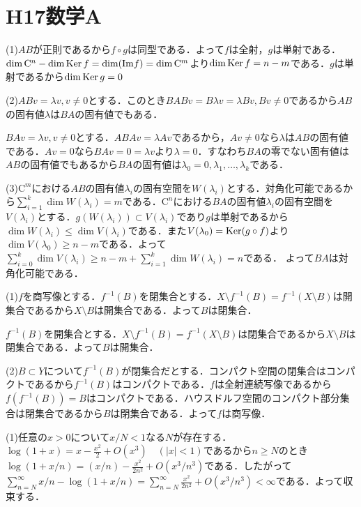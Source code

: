 \documentclass[
		book,
		head_space=20mm,
		foot_space=20mm,
		gutter=10mm,
		line_length=190mm
]{jlreq}
\begin{document}
\section{H17数学A}
(1)$AB$が正則であるから$f\circ g$は同型である．よって$f$は全射，$g$は単射である．$\dim \mathrm{C}^n-\dim \mathop{\mathrm{Ker}} f=\dim(\mathrm{Im} f)=\dim \mathrm{C}^m$より$\dim \mathop{\mathrm{Ker}} f=n-m$である．$g$は単射であるから$\dim \mathop{\mathrm{Ker}} g=0$

(2)$AB v=\lambda v,v\neq 0$とする．このとき$BAB v=B\lambda v=\lambda Bv,Bv\neq 0$であるから$AB$の固有値$\lambda$は$BA$の固有値でもある．

$BAv=\lambda v , v\neq 0$とする．$ABA v =\lambda Av$であるから，$Av\neq 0$なら$\lambda$は$AB$の固有値である．$Av=0$なら$BAv=0=\lambda v$より$\lambda=0$．すなわち$BA$の零でない固有値は$AB$の固有値でもあるから$BA$の固有値は$\lambda_0=0,\lambda_1,\dots,\lambda_k$である．

(3)$\mathrm{C}^m$における$AB$の固有値$\lambda_i$の固有空間を$W(\lambda_i)$とする．対角化可能であるから$\sum_{i=1}^k \dim W(\lambda_i)=m$である．$\mathrm{C}^n$における$BA$の固有値$\lambda_i$の固有空間を$V(\lambda_i)$とする．$g(W(\lambda_i))\subset V(\lambda_i)$であり$g$は単射であるから$\dim W(\lambda_i)\le \dim V(\lambda_i)$である．また$V(\lambda_0)=\mathop{\mathrm{Ker}} (g\circ f)$より$\dim V(\lambda_0)\ge n-m$である．よって$\sum_{i=0}^k \dim V(\lambda_i)\ge n-m+\sum_{i=1}^k \dim W(\lambda_i)=n$である．
よって$BA$は対角化可能である．

(1)$f$を商写像とする．$f^{-1}(B)$を閉集合とする．$X\setminus f^{-1}(B)=f^{-1}(X\setminus B)$は開集合であるから$X\setminus B$は開集合である．よって$B$は閉集合．

$f^{-1}(B)$を開集合とする．$X\setminus f^{-1}(B)=f^{-1}(X\setminus B)$は閉集合であるから$X\setminus B$は閉集合である．よって$B$は開集合．

(2)$B\subset Y$について$f^{-1}(B)$が閉集合だとする．コンパクト空間の閉集合はコンパクトであるから$f^{-1}(B)$はコンパクトである．$f$は全射連続写像であるから$f(f^{-1}(B))=B$はコンパクトである．ハウスドルフ空間のコンパクト部分集合は閉集合であるから$B$は閉集合である．よって$f$は商写像．

(1)任意の$x>0$について$x/N<1$なる$N$が存在する．$\log(1+x)=x-\frac{x^2}{2}+O(x^3)\quad(|x|<1)$であるから$n\ge N$のとき$\log(1+x/n)=(x/n)-\frac{x^2}{2n^2}+O(x^3/n^3)$である．したがって$\sum\limits_{n=N}^{\infty}x/n-\log(1+x/n)=\sum\limits_{n=N}^{\infty}\frac{x^2}{2n^2}+O(x^3/n^3)<\infty$である．よって収束する．
\end{document}
